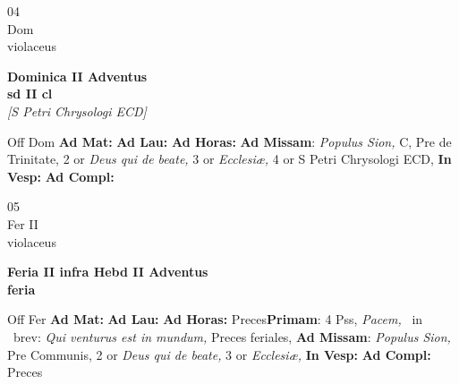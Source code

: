 \documentclass[10pt, openany]{book}
\begin{document}
        \begin{center}
            \begin{minipage}{3.5in}
                \vspace{2em}
                \begin{minipage}{0.5in}
                    {\Huge 04} \\
                    {\normalsize Dom} \\
                    {\normalsize violaceus}
                \end{minipage}
                \begin{minipage}{3.0in}
                    \textbf{ \large Dominica II Adventus \\
                    \textnormal{\normalsize sd II cl}} \\ \textit{[S Petri Chrysologi ECD]} \\ 
                \end{minipage}
                \begin{justify}Off Dom
                    \textbf{Ad Mat: }
                    \textbf{Ad Lau: }
                    \textbf{Ad Horas: }\textbf{Ad Missam}: \textit{Populus Sion,} C, Pre de Trinitate, 2 or \textit{Deus qui de beate,} 3 or \textit{Ecclesiæ,} 4 or S Petri Chrysologi ECD,  
                    \textbf{In Vesp: }
                    \textbf{Ad Compl: }
                \end{justify}
            \end{minipage}
        \end{center}
    
        \begin{center}
            \begin{minipage}{3.5in}
                \vspace{2em}
                \begin{minipage}{0.5in}
                    {\Huge 05} \\
                    {\normalsize Fer II} \\
                    {\normalsize violaceus}
                \end{minipage}
                \begin{minipage}{3.0in}
                    \textbf{ \large Feria II infra Hebd II Adventus \\
                    \textnormal{\normalsize feria}} \\ 
                \end{minipage}
                \begin{justify}Off Fer
                    \textbf{Ad Mat: }
                    \textbf{Ad Lau: }
                    \textbf{Ad Horas: }Preces\textbf{Primam}: 4 Pss, \textit{Pacem,} \Vbar\ in \Rbar\ brev: \textit{Qui venturus est in mundum,} Preces feriales, \textbf{Ad Missam}: \textit{Populus Sion,} Pre Communis, 2 or \textit{Deus qui de beate,} 3 or \textit{Ecclesiæ,}  
                    \textbf{In Vesp: }
                    \textbf{Ad Compl: }Preces
                \end{justify}
            \end{minipage}
        \end{center}
    
\end{document}
